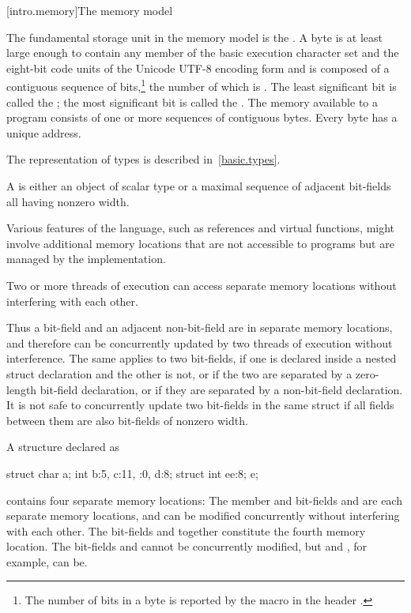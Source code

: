 [intro.memory]{The \Cpp memory model}

\pnum
{}%
The fundamental storage unit in the \Cpp memory model is the
.
A byte is at least large enough to contain any member of the basic
%
execution character set
and the eight-bit code units of the Unicode UTF-8 encoding form
and is composed of a contiguous sequence of
bits,\footnote{The number of bits in a byte is reported by the macro
 in the header .}
the number of which is . The least
significant bit is called the ; the most
significant bit is called the . The memory
available to a \Cpp program consists of one or more sequences of
contiguous bytes. Every byte has a unique address.

\pnum
\begin{note} The representation of types is described
in~\ref{basic.types}. \end{note}

\pnum
A  is either an object of scalar type or a maximal
sequence of adjacent bit-fields all having nonzero width. \begin{note} Various
features of the language, such as references and virtual functions, might
involve additional memory locations that are not accessible to programs but are
managed by the implementation. \end{note} Two or more threads of
execution can access separate memory
locations without interfering with each other.

\pnum
\begin{note} Thus a bit-field and an adjacent non-bit-field are in separate memory
locations, and therefore can be concurrently updated by two threads of execution
without interference. The same applies to two bit-fields, if one is declared
inside a nested struct declaration and the other is not, or if the two are
separated by a zero-length bit-field declaration, or if they are separated by a
non-bit-field declaration. It is not safe to concurrently update two bit-fields
in the same struct if all fields between them are also bit-fields of nonzero
width. \end{note}

\pnum
\begin{example} A structure declared as

\begin{codeblock}
struct {
  char a;
  int b:5,
  c:11,
  :0,
  d:8;
  struct {int ee:8;} e;
}
\end{codeblock}

contains four separate memory locations: The member  and bit-fields
 and  are each separate memory locations, and can be
modified concurrently without interfering with each other. The bit-fields
 and  together constitute the fourth memory location. The
bit-fields  and  cannot be concurrently modified, but
 and , for example, can be. \end{example}%

